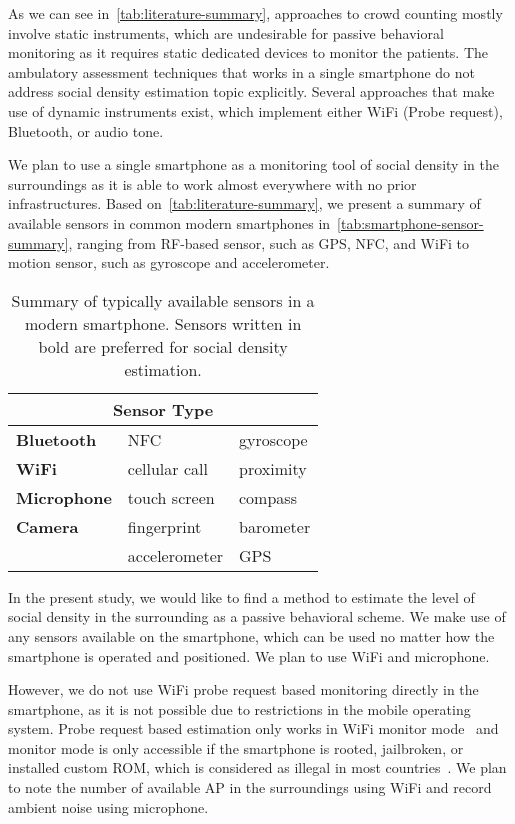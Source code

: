 	As we can see in~\autoref{tab:literature-summary}, approaches to crowd counting mostly involve static instruments, which are undesirable for passive behavioral monitoring as it requires static dedicated devices to monitor the patients. The ambulatory assessment techniques that works in a single smartphone do not address social density estimation topic explicitly. Several approaches that make use of dynamic instruments exist, which implement either WiFi (Probe request), Bluetooth, or audio tone.

	We plan to use a single smartphone as a monitoring tool of social density in the surroundings as it is able to work almost everywhere with no prior infrastructures. Based on~\autoref{tab:literature-summary}, we present a summary of available sensors in common modern smartphones in~\autoref{tab:smartphone-sensor-summary}, ranging from \ac{RF}-based sensor, such as \ac{GPS}, \ac{NFC}, and WiFi to motion sensor, such as gyroscope and accelerometer.



\begin{table}[h]
\centering
\caption[Summary of typical smartphone sensors]
{Summary of typically available sensors in a modern smartphone. Sensors written in bold are preferred for social density estimation.}
\label{tab:smartphone-sensor-summary}
\begin{tabular}{lll}
\toprule
\multicolumn{3}{c}{Sensor Type} \\ \midrule
\textbf{Bluetooth}   & \ac{NFC}                    & gyroscope \\
\textbf{WiFi}        & cellular call               & proximity \\
\textbf{Microphone}  & touch screen                & compass \\
\textbf{Camera}      & fingerprint                 & barometer \\
                     & accelerometer               & \ac{GPS} \\
\bottomrule
\end{tabular}
\end{table}

In the present study, we would like to find a method to estimate the level of social density in the surrounding as a passive behavioral scheme. We make use of any sensors available on the smartphone, which can be used no matter how the smartphone is operated and positioned. We plan to use WiFi and microphone.

However, we do not use WiFi probe request based monitoring directly in the smartphone, as it is not possible due to restrictions in the mobile operating system. Probe request based estimation only works in WiFi monitor mode~\cite{thesis052,thesis079} and monitor mode is only accessible if the smartphone is rooted, jailbroken, or installed custom \ac{ROM}, which is considered as illegal in most countries~\cite{rootjailbreak}. We plan to note the number of available \ac{AP} in the surroundings using WiFi and record ambient noise using microphone.

